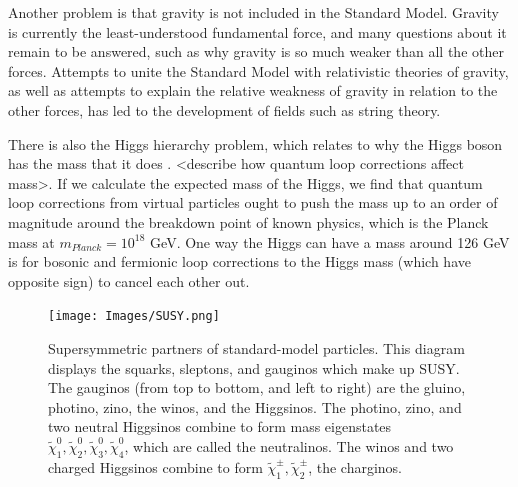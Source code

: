 Another problem is that gravity is not included in the Standard Model. Gravity is currently the least-understood fundamental force, and many questions about it remain to be answered, such as why gravity is so much weaker than all the other forces. Attempts to unite the Standard Model with relativistic theories of gravity, as well as attempts to explain the relative weakness of gravity in relation to the other forces, has led to the development of fields such as string theory.

There is also the Higgs hierarchy problem, which relates to why the Higgs boson has the mass that it does \cite{hierarchy}. <describe how quantum loop corrections affect mass>. If we calculate the expected mass of the Higgs, we find that quantum loop corrections from virtual particles ought to push the mass up to an order of magnitude around the breakdown point of known physics, which is the Planck mass at $m_{Planck} = 10^{18}$ GeV. One way the Higgs can have a mass around 126 GeV is for bosonic and fermionic loop corrections to the Higgs mass (which have opposite sign) to cancel each other out.

\begin{figure}[htbp]
    \centering
    \texttt{[image: Images/SUSY.png]}
    \caption{Supersymmetric partners of standard-model particles. This diagram displays the squarks, sleptons, and gauginos which make up SUSY. The gauginos (from top to bottom, and left to right) are the gluino, photino, zino, the winos, and the Higgsinos. The photino, zino, and two neutral Higgsinos combine to form mass eigenstates $\tilde{\chi}^0_1, \tilde{\chi}^0_2, \tilde{\chi}^0_3, \tilde{\chi}^0_4$, which are called the neutralinos. The winos and two charged Higgsinos combine to form $\tilde{\chi}^\pm_1, \tilde{\chi}^\pm_2$, the charginos.}
    \label{fig:my_label}
\end{figure}